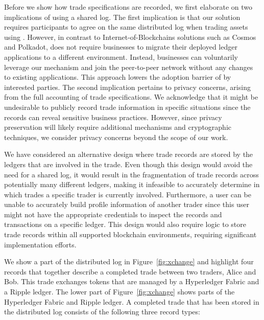 Before we show how trade specifications are recorded, we first elaborate on two implications of using a shared log.
The first implication is that our solution requires participants to agree on the same distributed log when trading assets using \ModelName{}.
However, in contrast to Internet-of-Blockchains solutions such as Cosmos and Polkadot, \ModelName{} does not require businesses to migrate their deployed ledger applications to a different environment.
Instead, businesses can voluntarily leverage our mechanism and join the \ModelName{} peer-to-peer network without any changes to existing applications.
This approach lowers the adoption barrier of \ModelName{} by interested parties.
The second implication pertains to privacy concerns, arising from the full accounting of trade specifications.
We acknowledge that it might be undesirable to publicly record trade information in specific situations since the records can reveal sensitive business practices.
However, since privacy preservation will likely require additional mechanisms and cryptographic techniques, we consider privacy concerns beyond the scope of our work.

We have considered an alternative design where trade records are stored by the ledgers that are involved in the trade.
Even though this design would avoid the need for a shared log, it would result in the fragmentation of trade records across potentially many different ledgers, making it infeasible to accurately determine in which trades a specific trader is currently involved.
Furthermore, a user can be unable to accurately build profile information of another trader since this user might not have the appropriate credentials to inspect the records and transactions on a specific ledger.
This design would also require logic to store \ModelName{} trade records within all supported blockchain environments, requiring significant implementation efforts.

We show a part of the distributed log in Figure~\ref{fig:xchange} and highlight four records that together describe a completed trade between two traders, Alice and Bob.
This trade exchanges tokens that are managed by a Hyperledger Fabric and a Ripple ledger.
The lower part of Figure~\ref{fig:xchange} shows parts of the Hyperledger Fabric and Ripple ledger.
A completed trade that has been stored in the distributed log consists of the following three record types:

